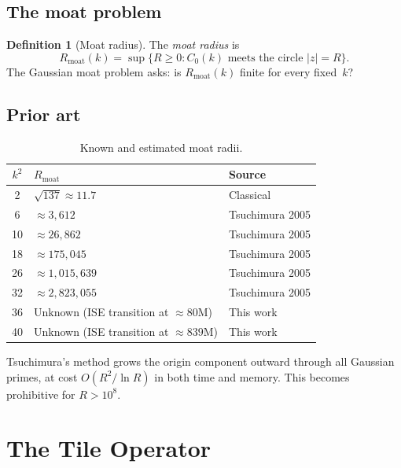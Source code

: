 \documentclass[11pt,a4paper]{article}
\newcommand{\Rmoat}{R_{\mathrm{moat}}}
\theoremstyle{definition}
\newtheorem{definition}{Definition}[section]
\theoremstyle{plain}
\theoremstyle{remark}
\begin{document}
\subsection{The moat problem}

\begin{definition}[Moat radius]\label{def:moat-radius}
The \emph{moat radius} is
\[
  \Rmoat(k) = \sup\{R \ge 0 : C_0(k) \text{ meets the circle } |z| = R\}.
\]
The Gaussian moat problem asks: is $\Rmoat(k)$ finite for every fixed~$k$?
\end{definition}

\subsection{Prior art}

\begin{table}[ht]
\centering
\begin{tabular}{@{}cll@{}}
\toprule
$k^2$ & $\Rmoat$ & Source \\
\midrule
2  & $\sqrt{137} \approx 11.7$           & Classical \\
6  & $\approx 3{,}612$                   & Tsuchimura 2005 \\
10 & $\approx 26{,}862$                  & Tsuchimura 2005 \\
18 & $\approx 175{,}045$                 & Tsuchimura 2005 \\
26 & $\approx 1{,}015{,}639$             & Tsuchimura 2005 \\
32 & $\approx 2{,}823{,}055$             & Tsuchimura 2005 \\
36 & Unknown (ISE transition at $\approx 80\text{M}$)  & This work \\
40 & Unknown (ISE transition at $\approx 839\text{M}$) & This work \\
\bottomrule
\end{tabular}
\caption{Known and estimated moat radii.}
\label{tab:prior-art}
\end{table}

Tsuchimura's method grows the origin component outward through all Gaussian primes, at cost $O(R^2 / \ln R)$ in both time and memory.  This becomes prohibitive for $R > 10^8$.


\section{The Tile Operator}\label{sec:tile-operator}
\end{document}
